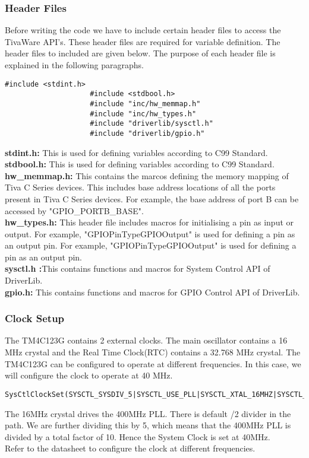 \documentclass[a4paper,10pt,oneside]{article}
\begin{document}
{			\subsubsection{\textbf{Header Files}}
				{Before writing the code we have to include certain header files to access the TivaWare API's. These header files are required for variable definition. The header files to included are given below. The purpose of each header file is explained in the following paragraphs.
				\begin{lstlisting}[style=CStyle]
					#include <stdint.h>
					#include <stdbool.h>
					#include "inc/hw_memmap.h"
					#include "inc/hw_types.h"
					#include "driverlib/sysctl.h" 
					#include "driverlib/gpio.h"				\end{lstlisting}
				\textbf{stdint.h: }This is used for defining variables according to C99 Standard.\\
				\textbf{stdbool.h: }This is used for defining variables according to C99 Standard.\\
				\textbf{hw\_memmap.h: }This contains the marcos defining the memory mapping of Tiva C Series devices. This includes base address locations of all the ports present in Tiva C Series devices. For example, the base address of port B can be accessed by "GPIO\_PORTB\_BASE". \\
				\textbf{hw\_types.h: }This header file includes macros for initialising a pin as input or output. For example, "GPIOPinTypeGPIOOutput" is used for defining a pin as an output pin. For example, "GPIOPinTypeGPIOOutput" is used for defining a pin as an output pin.  \\ 
				\textbf{sysctl.h :}This contains functions and macros for System Control API of DriverLib. \\
				\textbf{gpio.h: }This contains functions and macros for GPIO Control API of DriverLib. }
			\subsubsection{\textbf{Clock Setup}}
				{The TM4C123G contains 2  external clocks. The main oscillator contains a 16 MHz crystal and the Real Time Clock(RTC) contains a 32.768 MHz crystal. The TM4C123G can be configured to operate at different frequencies. In this case, we will configure the clock to operate at 40 MHz.}
				\begin{lstlisting}[style=CStyle]
					SysCtlClockSet(SYSCTL_SYSDIV_5|SYSCTL_USE_PLL|SYSCTL_XTAL_16MHZ|SYSCTL_OSC_MAIN); \end{lstlisting}
				{The 16MHz crystal drives the 400MHz PLL. There is default /2 divider in the path. We are further dividing this by 5, which means that the 400MHz PLL is divided by a total factor of 10. Hence the System Clock is set at 40MHz.\\
				Refer to the datasheet to configure the clock at different frequencies.} 	
}
\end{document}
